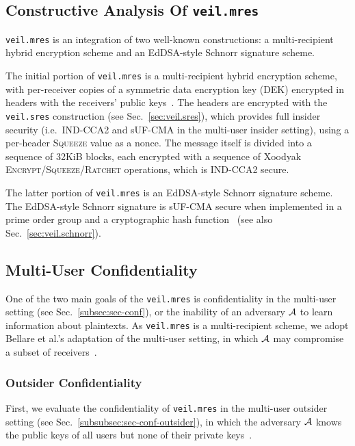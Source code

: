 \subsection{Constructive Analysis Of \texttt{veil.mres}}\label{subsec:veil.mres-analysis}

\texttt{veil.mres} is an integration of two well-known constructions: a multi-recipient hybrid encryption scheme and an
EdDSA-style Schnorr signature scheme.

The initial portion of \texttt{veil.mres} is a multi-recipient hybrid encryption scheme, with per-receiver copies of a
symmetric data encryption key (DEK) encrypted in headers with the receivers' public
keys~\cite{kurosawa2002, bellare2003, bellare2007, rfc4880}.
The headers are encrypted with the \texttt{veil.sres} construction (see Sec.~\ref{sec:veil.sres}), which provides full
insider security (i.e.\ IND-CCA2 and sUF-CMA in the multi-user insider setting), using a per-header \textsc{Squeeze}
value as a nonce.
The message itself is divided into a sequence of 32KiB blocks, each encrypted with a sequence of Xoodyak
\textsc{Encrypt}/\textsc{Squeeze}/\textsc{Ratchet} operations, which is IND-CCA2 secure.

The latter portion of \texttt{veil.mres} is an EdDSA-style Schnorr signature scheme.
The EdDSA-style Schnorr signature is sUF-CMA secure when implemented in a prime order group and a cryptographic hash
function~\cite{brendel2021, chalkias2020, pointcheval2000, neven2009} (see also Sec.~\ref{sec:veil.schnorr}).

\subsection{Multi-User Confidentiality}\label{subsec:veil.mres-conf}

One of the two main goals of the \texttt{veil.mres} is confidentiality in the multi-user setting
(see Sec.~\ref{subsec:sec-conf}), or the inability of an adversary $\mathcal{A}$ to learn information about plaintexts.
As \texttt{veil.mres} is a multi-recipient scheme, we adopt Bellare et al.'s adaptation of the multi-user
setting, in which $\mathcal{A}$ may compromise a subset of receivers~\cite{bellare2007}.

\subsubsection{Outsider Confidentiality}

First, we evaluate the confidentiality of \texttt{veil.mres} in the multi-user outsider setting
(see Sec.~\ref{subsubsec:sec-conf-outsider}), in which the adversary $\mathcal{A}$ knows the public keys of all users but
none of their private keys~\cite[p. 44]{baek2010}.

